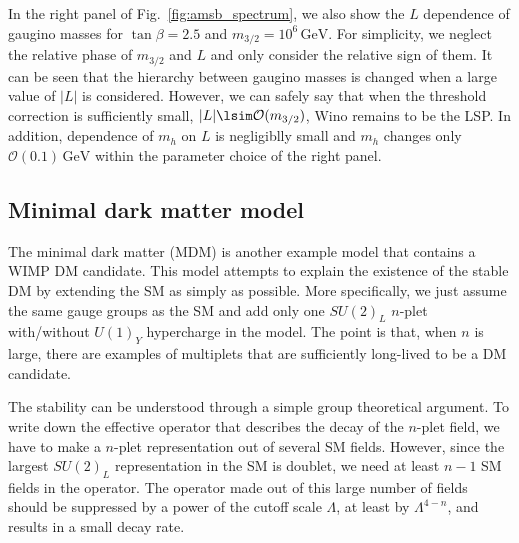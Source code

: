 \documentclass[12pt,twoside,book]{article}
\begin{document}
In the right panel of Fig.~\ref{fig:amsb_spectrum}, we also show the $L$ dependence of gaugino masses for $\tan\beta = 2.5$ and $m_{3/2} = 10^6\,\mathrm{GeV}$.
For simplicity, we neglect the relative phase of $m_{3/2}$ and $L$ and only consider the relative sign of them.
It can be seen that the hierarchy between gaugino masses is changed when a large value of $|L|$ is considered.
However, we can safely say that when the threshold correction is sufficiently small, $|L| \lsim \mathcal{O}(m_{3/2})$, Wino remains to be the LSP.
In addition, dependence of $m_h$ on $L$ is negligiblly small and $m_h$ changes only $\mathcal{O} (0.1)\,\mathrm{GeV}$ within the parameter choice of the right panel.


\subsection{Minimal dark matter model}

The minimal dark matter (MDM) \cite{Cirelli:2005uq, Cirelli:2007xd, Cirelli:2009uv} is another example model that contains a WIMP DM candidate.
This model attempts to explain the existence of the stable DM by extending the SM as simply as possible.
More specifically, we just assume the same gauge groups as the SM and add only one $SU(2)_L$ $n$-plet with/without $U(1)_Y$ hypercharge in the model.
The point is that, when $n$ is large, there are examples of multiplets that are sufficiently long-lived to be a DM candidate.

The stability can be understood through a simple group theoretical argument.
To write down the effective operator that describes the decay of the $n$-plet field, we have to make a $n$-plet representation out of several SM fields.
However, since the largest $SU(2)_L$ representation in the SM is doublet, we need at least $n-1$ SM fields in the operator.
The operator made out of this large number of fields should be suppressed by a power of the cutoff scale $\Lambda$, at least by $\Lambda^{4-n}$, and results in a small decay rate.


\end{document}
